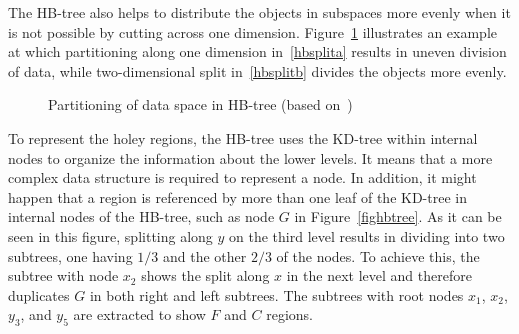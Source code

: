 \documentclass[a4paper,12pt]{article}
\begin{document}
The HB-tree also helps to distribute the objects in subspaces more evenly when it is not possible by cutting across one dimension. Figure~\ref{hbtree} illustrates an example at which partitioning along one dimension in~\ref{hbsplita} results in uneven division of data, while two-dimensional split in~\ref{hbsplitb} divides the objects more evenly.

\begin{figure}
\centering
{}
\centering
{}
\caption{Partitioning of data space in HB-tree (based on~\cite{tree-basedindexes})}
\label{hbtree}
\end{figure}

To represent the holey regions, the HB-tree uses the KD-tree within internal nodes to organize the information about the lower levels. It means that a more complex data structure is required to represent a node. In addition, it might happen that a region is referenced by more than one leaf of the KD-tree in internal nodes of the HB-tree, such as node $G$ in Figure~\ref{fighbtree}. As it can be seen in this figure, splitting along $y$ on the third level results in dividing into two subtrees, one having $1/3$ and the other $2/3$ of the nodes. To achieve this, the subtree with node $x_2$ shows the split along $x$ in the next level and therefore duplicates $G$ in both right and left subtrees. The subtrees with root nodes $x_1$, $x_2$, $y_3$, and $y_5$ are extracted to show $F$ and $C$ regions.
\end{document}

